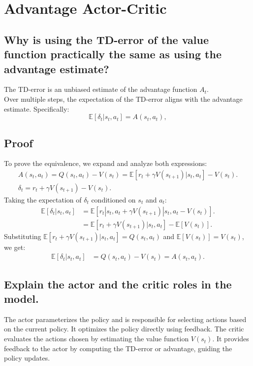 \documentclass[a4paper]{article}
\begin{document}
\section{Advantage Actor-Critic}\label{sec:advantage-actor-critic}

\subsection{Why is using the TD-error of the value function practically the same as using the advantage estimate?}\label{subsec:why-is-using-the-td-error-of-the-value-function-practically-the-same-as-using-the-advantage-estimate?-prove.}
The TD-error is an unbiased estimate of the advantage function \(A_t\).
\\
Over multiple steps, the expectation of the TD-error aligns with the advantage estimate.
Specifically:
\[
\mathbb{E}[\delta_t | s_t, a_t] = A(s_t, a_t),
\]

\subsection*{Proof}
To prove the equivalence, we expand and analyze both expressions:
\begin{gather*}
    A(s_t, a_t) = Q(s_t, a_t) - V(s_t) = \mathbb{E}[r_t + \gamma V(s_{t+1}) | s_t, a_t] - V(s_t).\\
    \delta_t = r_t + \gamma V(s_{t+1}) - V(s_t).
\end{gather*}
Taking the expectation of $\delta_t$ conditioned on $s_t$ and $a_t$:
\begin{align*}
    \mathbb{E}[\delta_t | s_t, a_t] &= \mathbb{E}[r_t | s_t, a_t + \gamma V(s_{t+1}) | s_t, a_t - V(s_t)].\\
   &= \mathbb{E}[r_t + \gamma V(s_{t+1}) | s_t, a_t] - \mathbb{E}[V(s_t)].
\end{align*}
Substituting $\mathbb{E}[r_t + \gamma V(s_{t+1}) | s_t, a_t] = Q(s_t, a_t)$ and $\mathbb{E}[V(s_t)] = V(s_t)$, we get:
    \begin{align*}
    \mathbb{E}[\delta_t | s_t, a_t] &= Q(s_t, a_t) - V(s_t) = A(s_t, a_t).
    \end{align*}

\subsection{Explain the actor and the critic roles in the model.}\label{subsec:explain-the-actor-and-the-critic-roles-in-the-model.}
The actor parameterizes the policy and is responsible for selecting actions based on the current policy.
It optimizes the policy directly using feedback.
The critic evaluates the actions chosen by estimating the value function \(V(s_t)\).
It provides feedback to the actor by computing the TD-error or advantage, guiding the policy updates.
\end{document}
